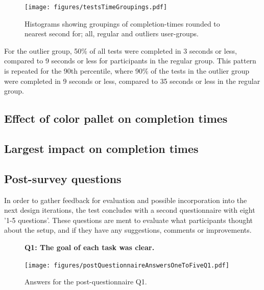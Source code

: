 \documentclass[nofilelist,dvipsnames]{cslthse-msc}
\begin{document}
{        \begin{figure}[h!]
          \centering
          \texttt{[image: figures/testsTimeGroupings.pdf]}
          \caption{
            Histograms showing groupings of completion-times rounded to nearest
            second for; all, regular and outliers user-groups.
          }
        \end{figure}

        For the outlier group, 50\% of all tests were completed in 3 seconds or
        less, compared to 9 seconds or less for participants in the regular
        group. This pattern is repeated for the 90th percentile, where 90\% of
        the tests in the outlier group were completed in 9 seconds or less,
        compared to 35 seconds or less in the regular group.

			\subsection{Effect of color pallet on completion times}


			\subsection{Largest impact on completion times}


			\subsection{Post-survey questions}

        In order to gather feedback for evaluation and possible incorporation
        into the next design iterations, the test concludes with a second
        questionnaire with eight '1-5 questions'. These questions are ment to
        evaluate what participants thought about the setup, and if they have
        any suggestions, comments or improvements.

				\begin{figure}[h!]
          \textbf{Q1: The goal of each task was clear.}
          \begin{center}
            \texttt{[image: figures/postQuestionnaireAnswersOneToFiveQ1.pdf]}
            \vspace{-1cm}
            \caption{Answers for the post-questionnaire Q1.}
          \end{center}
				\end{figure}

}
\end{document}
